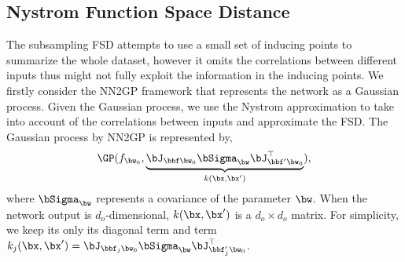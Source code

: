 \subsection{Nystrom Function Space Distance}
The subsampling FSD attempts to use a small set of inducing points to summarize the whole dataset, however it omits the correlations between different inputs thus might not fully exploit the information in the inducing points. We firstly consider the NN2GP framework that represents the network as a Gaussian process. Given the Gaussian process, we use the Nystrom approximation to take into account of the correlations between inputs and approximate the FSD. The Gaussian process by NN2GP is represented by,
\begin{align}
\GP(f_{\bw_0}, \underbrace{\bJ_{\bbf \bw_0} \bSigma_{\bw} \bJ_{\bbf' \bw_0}^{\top}}_{k(\bx, \bx')}),
\end{align}
where $\bSigma_{\bw}$ represents a covariance of the parameter $\bw$. When the network output is $d_o$-dimensional, $k(\bx, \bx')$ is a $d_o \times d_o$ matrix. For simplicity, we keep its only its diagonal term and term $k_j(\bx, \bx') = \bJ_{\bbf_j \bw_0} \bSigma_{\bw} \bJ_{\bbf_j' \bw_0}^{\top} $.



